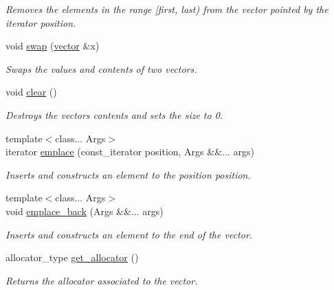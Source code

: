 \begin{DoxyCompactItemize}
\begin{DoxyCompactList}\small\item\em Removes the elements in the range \mbox{[}first, last) from the vector pointed by the iterator position. \end{DoxyCompactList}\item 
void \mbox{\hyperlink{classfake_1_1vector_ac480f82e092e044293c38539b4db9430}{swap}} (\mbox{\hyperlink{classfake_1_1vector}{vector}} \&x)
\begin{DoxyCompactList}\small\item\em Swaps the values and contents of two vectors. \end{DoxyCompactList}\item 
\mbox{\label{classfake_1_1vector_a5e78aea1924eda8e204a682b2715ce78}} 
void \mbox{\hyperlink{classfake_1_1vector_a5e78aea1924eda8e204a682b2715ce78}{clear}} ()
\begin{DoxyCompactList}\small\item\em Destroys the vectors contents and sets the size to 0. \end{DoxyCompactList}\item 
{\footnotesize template$<$class... Args$>$ }\\iterator \mbox{\hyperlink{classfake_1_1vector_abc8d17690a8ec6dcbfcc3f02baad3f30}{emplace}} (const\+\_\+iterator position, Args \&\&... args)
\begin{DoxyCompactList}\small\item\em Inserts and constructs an element to the position position. \end{DoxyCompactList}\item 
{\footnotesize template$<$class... Args$>$ }\\void \mbox{\hyperlink{classfake_1_1vector_a00b1615dab9508281f3270b5052567ee}{emplace\+\_\+back}} (Args \&\&... args)
\begin{DoxyCompactList}\small\item\em Inserts and constructs an element to the end of the vector. \end{DoxyCompactList}\item 
allocator\+\_\+type \mbox{\hyperlink{classfake_1_1vector_a1fbe6cb70f084552189f747b3130d86f}{get\+\_\+allocator}} ()
\begin{DoxyCompactList}\small\item\em Returns the allocator associated to the vector. \end{DoxyCompactList}\end{DoxyCompactItemize}


